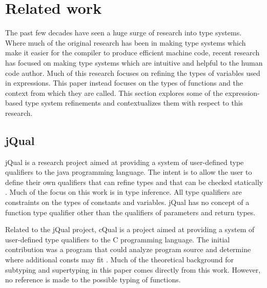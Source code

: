 \chapter{Related work}

The past few decades have seen a huge surge of research into type systems.  Where much of the original research has been in making type systems which make it easier for the compiler to produce efficient machine code, recent research has focused on making type systems which are intuitive and helpful to the human code author.  Much of this research focuses on refining the types of variables used in expressions.  This paper instead focuses on the types of functions and the context from which they are called.  This section explores some of the expression-based type system refinements and contextualizes them with respect to this research.

\section{jQual}

jQual is a research project aimed at providing a system of user-defined type qualifiers to the java programming language.  The intent is to allow the user to define their own qualifiers that can refine types and that can be checked statically \cite{jqual-inference, jqual-qualify}.  Much of the focus on this work is in type inference.  All type qualifiers are constraints on the types of constants and variables.  jQual has no concept of a function type qualifier other than the qualifiers of parameters and return types.  

Related to the jQual project, cQual is a project aimed at providing a system of user-defined type qualifiers to the C programming language.  The initial contribution was a program that could analyze program source and determine where additional consts may fit \cite{theory-of-qual}.  Much of the theoretical background for subtyping and supertyping in this paper comes directly from this work.  However, no reference is made to the possible typing of functions.  
